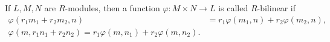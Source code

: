 If $L, M, N$ are $R$-modules, then a function $\varphi\colon M\times N\to L$ is
called $R$-bilinear if
\begin{align*}
	\varphi(r_1m_1 + r_2m_2, n) &= r_1\varphi(m_1, n) + r_2\varphi(m_2, n),\\
	\varphi(m, r_1n_1+r_2n_2) = r_1\varphi(m, n_1) + r_2\varphi(m, n_2).
\end{align*}
